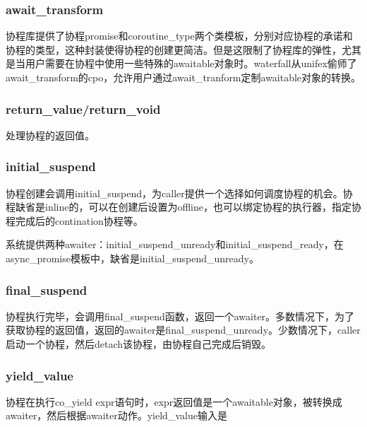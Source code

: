 \documentclass{article}
\begin{document}
\subsubsection{await\_transform}

协程库提供了协程promise和coroutine\_type两个类模板，分别对应协程的承诺和协程的类型，这种封装使得协程的创建更简洁。但是这限制了协程库的弹性，尤其是当用户需要在协程中使用一些特殊的awaitable对象时。waterfall从unifex偷师了await\_transform的cpo，允许用户通过await\_tranform定制awaitable对象的转换。

\subsubsection{return\_value/return\_void}

处理协程的返回值。

\subsubsection{initial\_suspend}

协程创建会调用initial\_suspend，为caller提供一个选择如何调度协程的机会。协程缺省是inline的，可以在创建后设置为offline，也可以绑定协程的执行器，指定协程完成后的contination协程等。

系统提供两种awaiter：initial\_suspend\_unready和initial\_suspend\_ready，在async\_promise模板中，缺省是initial\_suspend\_unready。

\subsubsection{final\_suspend}

协程执行完毕，会调用final\_suspend函数，返回一个awaiter。多数情况下，为了获取协程的返回值，返回的awaiter是final\_suspend\_unready。少数情况下，caller启动一个协程，然后detach该协程，由协程自己完成后销毁。

\subsubsection{yield\_value}

协程在执行co\_yield expr语句时，expr返回值是一个awaitable对象，被转换成awaiter，然后根据awaiter动作。yield\_value输入是






\printbibliography

\appendix
\end{document}
